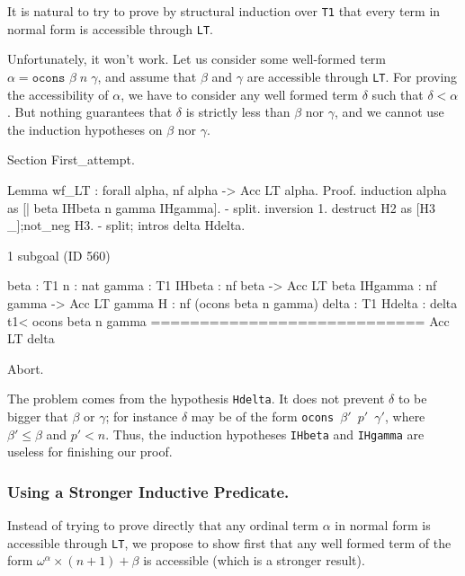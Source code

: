 It is natural to try to prove by structural induction over \texttt{T1} 
that every term in normal form is accessible through \texttt{LT}.

Unfortunately, it won't work. Let us consider some well-formed term
 $\alpha=\texttt{ocons $\beta\;n\;\gamma$}$, and assume that \(\beta\) and \(\gamma\) are accessible
 through \texttt{LT}. For proving the accessibility of $\alpha$, we have to consider
any well formed term \(\delta\) such that \(\delta<\alpha\). 
But nothing guarantees that \(\delta\)  is strictly  less than \(\beta\) nor \(\gamma\), and we cannot use the induction hypotheses on   \(\beta\) nor \(\gamma\).

\begin{Coqbad}
Section First_attempt.

 Lemma wf_LT : forall alpha,  nf alpha -> Acc LT alpha. 
 Proof.
  induction alpha as [| beta IHbeta n gamma IHgamma].
  - split.
    inversion 1.
    destruct H2 as [H3 _];not_neg H3.
  -  split; intros delta Hdelta.
\end{Coqbad}

\begin{Coqanswer}
1 subgoal (ID 560)
  
  beta : T1
  n : nat
  gamma : T1
  IHbeta : nf beta -> Acc LT beta
  IHgamma : nf gamma -> Acc LT gamma
  H : nf (ocons beta n gamma)
  delta : T1
  Hdelta : delta t1< ocons beta n gamma
  ============================
  Acc LT delta
 \end{Coqanswer}

\begin{Coqbad}
  Abort.
\end{Coqbad}

The problem comes from the hypothesis \texttt{Hdelta}. It does not prevent  \(\delta\) to be bigger that \(\beta\) or
\(\gamma\);
for instance \(\delta\) may be of the form
\texttt{ocons $\beta'$ $p'$  $\gamma'$},
where  \(\beta' \leq  \beta\) and  \(p' < n\).
Thus, the induction hypotheses \texttt{IHbeta} and \texttt{IHgamma}  are useless for finishing our proof.

\subsubsection{Using a Stronger Inductive Predicate.}
\label{sec:orgheadline78}
  Instead of trying to prove directly that any ordinal term \(\alpha\) in normal form is accessible
through \texttt{LT}, we propose to show first that any well formed 
term of the form \(\omega^\alpha\times(n+1)+\beta\) is accessible (which is a stronger result).

